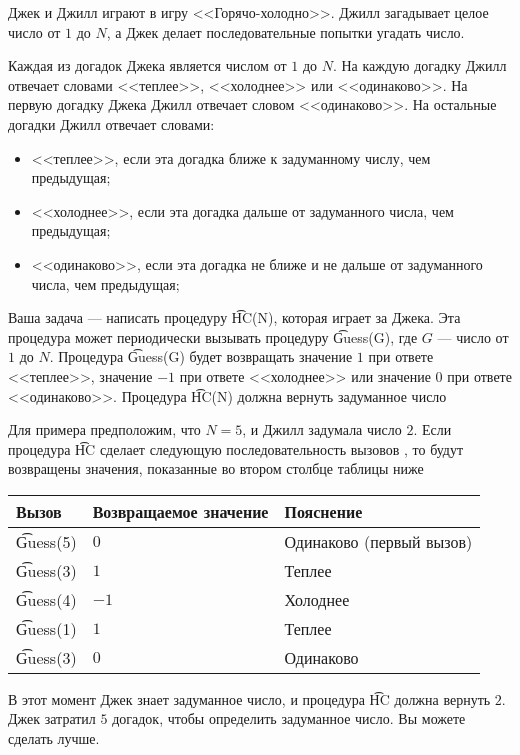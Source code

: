 Джек и Джилл играют в игру <<Горячо-холодно>>. Джилл загадывает целое число от $1$ до $N$, а Джек делает последовательные попытки угадать число.

Каждая из догадок Джека является числом от $1$ до $N$. На каждую догадку Джилл отвечает словами <<теплее>>, <<холоднее>> или <<одинаково>>. На первую догадку Джека Джилл отвечает словом <<одинаково>>. На остальные догадки Джилл отвечает словами: 
\begin{itemize}
\item <<теплее>>, если эта догадка ближе к задуманному числу, чем предыдущая; 
\item <<холоднее>>, если эта догадка дальше от задуманного числа, чем предыдущая; 
\item <<одинаково>>, если эта догадка не ближе и не дальше от задуманного числа, чем предыдущая;
\end{itemize}

Ваша задача --- написать процедуру \t{HC(N)}, которая играет за Джека. Эта процедура может периодически вызывать процедуру \t{Guess(G)}, где $G$ --- число от $1$ до $N$. Процедура \t{Guess(G)} будет возвращать значение $1$ при ответе <<теплее>>, значение $-1$ при ответе <<холоднее>> или значение $0$ при ответе <<одинаково>>. Процедура \t{HC(N)} должна вернуть задуманное число

Для примера предположим, что $N=5$, и Джилл задумала число $2$. Если процедура \t{HC} сделает следующую последовательность вызовов , то будут возвращены значения, показанные во втором столбце таблицы ниже

\begin{tabular}{|l|l|l|} \hline
Вызов & Возвращаемое значение & Пояснение\\ \hline
\t{Guess(5)} & $0$ & Одинаково (первый вызов) \\ \hline
\t{Guess(3)} & $1$ & Теплее \\ \hline
\t{Guess(4)} & $-1$ & Холоднее \\ \hline
\t{Guess(1)} & $1$ & Теплее \\ \hline
\t{Guess(3)} & $0$ & Одинаково \\ \hline
\end{tabular}

В этот момент Джек знает задуманное число, и процедура \t{HC} должна вернуть $2$. Джек затратил $5$ догадок, чтобы определить задуманное число. Вы можете сделать лучше.
